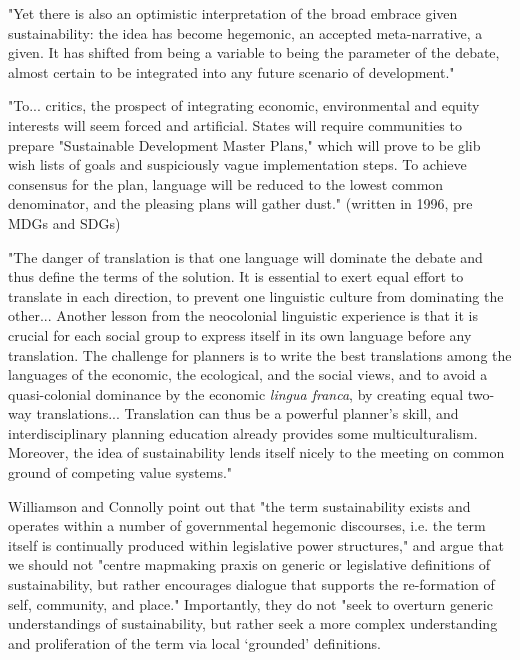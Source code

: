 "Yet there is also an optimistic interpretation of the broad embrace given sustainability: the idea has become hegemonic, an accepted meta-narrative, a given. It has shifted from being a variable to being the parameter of the debate, almost certain to be integrated into any future scenario of development." \cite{campbellGreenCitiesGrowing2016}

"To... critics, the prospect of integrating economic, environmental and equity interests will seem forced and artificial. States will require communities to prepare "Sustainable Development Master Plans," which will prove to be glib wish lists of goals and suspiciously vague implementation steps. To achieve consensus for the plan, language will be reduced to the lowest common denominator, and the pleasing plans will gather dust." (written in 1996, pre MDGs and SDGs) \cite{campbellGreenCitiesGrowing2016}

"The danger of translation is that one language will dominate the debate and thus define the terms of the solution. It is essential to exert equal effort to translate in each direction, to prevent one linguistic culture from dominating the other... Another lesson from the neocolonial linguistic experience is that it is crucial for each social group to express itself in its own language before any translation. The challenge for planners is to write the best translations among the languages of the economic, the ecological, and the social views, and to avoid a quasi-colonial dominance by the economic \textit{lingua franca}, by creating equal two-way translations... Translation can thus be a powerful planner's skill, and interdisciplinary planning education already provides some multiculturalism. Moreover, the idea of sustainability lends itself nicely to the meeting on common ground of competing value systems." \cite{campbellGreenCitiesGrowing2016}

Williamson and Connolly point out that "the term sustainability exists and operates within a number of governmental hegemonic discourses, i.e. the term itself is continually produced within legislative power structures," and argue that we should not "centre mapmaking praxis on generic or legislative definitions of sustainability, but rather encourages dialogue that supports the re-formation of self, community, and place." Importantly, they do not "seek to overturn generic understandings of sustainability, but rather seek a more complex understanding and proliferation of the term via local `grounded' definitions. \cite{williamsonTheirworkDevelopmentSustainable2011} 


